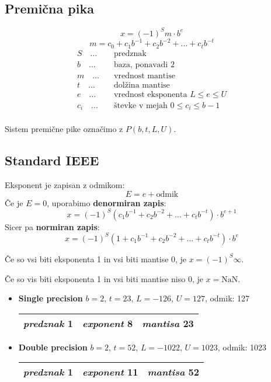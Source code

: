 
 

\begin{multicols}{4}
\setlength{\premulticols}{1pt}
\setlength{\postmulticols}{1pt}
\setlength{\multicolsep}{1pt}
\setlength{\columnsep}{2pt}

\section{Premična pika}
\[ x = (-1)^S m \cdot b^e\]
\[ m = c_0 + c_1 b^{-1} + c_2 b^{-2} + \dots + c_t b^{-t} \]
\begin{align*}
	S\quad \dots \quad & \text{predznak} \\
	b\quad \dots \quad & \text{baza, ponavadi 2} \\
	m\quad \dots \quad & \text{vrednost mantise} \\
	t\quad \dots \quad & \text{dolžina mantise} \\
	e\quad \dots \quad & \text{vrednost eksponenta $L \leq e \leq U$} \\
	c_i\quad \dots \quad & \text{števke v mejah $0 \leq c_i \leq b-1$} \\
\end{align*}

Sistem premične pike označimo z $P(b, t, L, U)$.

\subsection{Standard IEEE}
Eksponent je zapisan z odmikom:
\[ E = e + \text{odmik}\]
Če je $E=0$, uporabimo \textbf{denormiran zapis}:
\[ x = (-1)^S (c_1 b^{-1} + c_2 b^{-2} + \dots + c_t b^{-t}) \cdot b^{e+1}\]
Sicer pa \textbf{normiran zapis}:
\[ x = (-1)^S (1 + c_1 b^{-1} + c_2 b^{-2} + \dots + c_t b^{-t}) \cdot b^{e}\]

Če so vsi biti eksponenta 1 in vsi biti mantise 0, je $x = (-1)^S \infty$.

Če so vis biti eksponenta 1 in vsi biti mantise niso 0, je $x = \text{NaN}$.

\begin{itemize}
	\item \textbf{Single precision} $b=2$, $t=23$, $L=-126$, $U=127$,
	odmik: 127
	\begin{center}
		\begin{tabular}{ |c|c|c| } 
			\hline
			\textit{predznak} 1 & \textit{exponent} 8 & \textit{mantisa} 23 \\ 
			\hline
		\end{tabular}
	\end{center}
	\item \textbf{Double precision} $b=2$, $t=52$, $L=-1022$, $U=1023$, 
	odmik: 1023
	\begin{center}
		\begin{tabular}{ |c|c|c| } 
		 \hline
		 \textit{predznak} 1 & \textit{exponent} 11 & \textit{mantisa} 52 \\ 
		 \hline
		\end{tabular}
	\end{center}
\end{itemize}


\end{multicols}
